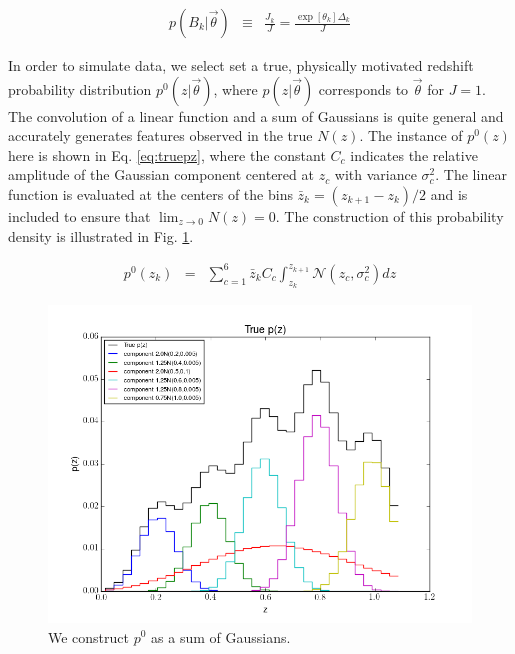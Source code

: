 \documentclass[12pt, onecolumn]{emulateapj}
\begin{document}
\begin{eqnarray}
\label{eq:dparams}
p(B_{k}|\vec{\theta}) &\equiv& \frac{J_{k}}{J} = \frac{\exp[\theta_{k}]\Delta_{k}}{J}
\end{eqnarray}

In order to simulate data, we select set a true, physically motivated redshift probability distribution $p^{0}(z|\vec{\theta})$, where $p(z|\vec{\theta})$ corresponds to $\vec{\theta}$ for $J=1$.  The convolution of a linear function and a sum of Gaussians is quite general and accurately generates features observed in the true $N(z)$.  The instance of $p^{0}(z)$ here is shown in Eq. \ref{eq:truepz}, where the constant $C_{c}$ indicates the relative amplitude of the Gaussian component centered at $z_{c}$ with variance $\sigma_{c}^{2}$.  The linear function is evaluated at the centers of the bins $\bar{z}_{k}=(z_{k+1}-z_{k})/2$ and is included to ensure that $\lim_{z\to0}N(z)=0$.  The construction of this probability density is illustrated in Fig. \ref{fig:truepz}.  

\begin{eqnarray}
\label{eq:truepz}
p^{0}(z_{k}) &=& \sum_{c=1}^{6}\bar{z}_{k}C_{c}\int_{z_{k}}^{z_{k+1}} \mathcal{N}(z_{c},\sigma^{2}_{c})dz
\end{eqnarray}

\begin{figure}
\label{fig:truepz}
\includegraphics[scale=0.5]{truePz.png}
\caption{We construct $p^{0}$ as a sum of Gaussians.}
\end{figure}
\end{document}
